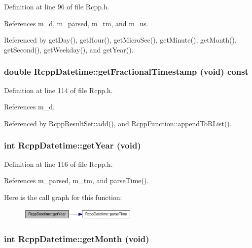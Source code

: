 Definition at line 96 of file Rcpp.h.

References m\_\-d, m\_\-parsed, m\_\-tm, and m\_\-us.

Referenced by getDay(), getHour(), getMicroSec(), getMinute(), getMonth(), getSecond(), getWeekday(), and getYear().\hypertarget{classRcppDatetime_cb74d27387c0d851414e20d30354ac62}{
\subsubsection[getFractionalTimestamp]{\setlength{\rightskip}{0pt plus 5cm}double RcppDatetime::getFractionalTimestamp (void) const}}
\label{classRcppDatetime_cb74d27387c0d851414e20d30354ac62}




Definition at line 114 of file Rcpp.h.

References m\_\-d.

Referenced by RcppResultSet::add(), and RcppFunction::appendToRList().\hypertarget{classRcppDatetime_ba930a8d7d575eb10444258a442027cf}{
\subsubsection[getYear]{\setlength{\rightskip}{0pt plus 5cm}int RcppDatetime::getYear (void)}}
\label{classRcppDatetime_ba930a8d7d575eb10444258a442027cf}




Definition at line 116 of file Rcpp.h.

References m\_\-parsed, m\_\-tm, and parseTime().

Here is the call graph for this function:\nopagebreak
\begin{figure}[H]
\begin{center}
\leavevmode
\includegraphics[width=164pt]{classRcppDatetime_ba930a8d7d575eb10444258a442027cf_cgraph}
\end{center}
\end{figure}
\hypertarget{classRcppDatetime_a7f04947d2a27e4bba2d19efa21771ed}{
\subsubsection[getMonth]{\setlength{\rightskip}{0pt plus 5cm}int RcppDatetime::getMonth (void)}}
\label{classRcppDatetime_a7f04947d2a27e4bba2d19efa21771ed}




